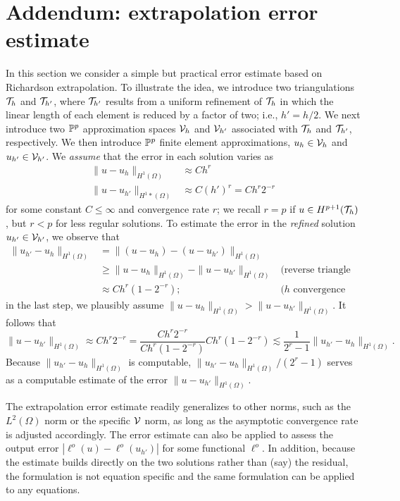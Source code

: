 \clearpage
\section{Addendum: extrapolation error estimate}
In this section we consider a simple but practical error estimate based on Richardson extrapolation.  %
To illustrate the idea, we introduce two triangulations $\mathcal{T}_h$ and $\mathcal{T}_{h'}$, where $\mathcal{T}_{h'}$ results from a uniform refinement of $\mathcal{T}_h$ in which the linear length of each element is reduced by a factor of two; i.e., $h' = h/2$. We next introduce two $\mathbb{P}^p$ approximation spaces $\mathcal{V}_h$ and $\mathcal{V}_{h'}$ associated with $\mathcal{T}_h$ and $\mathcal{T}_{h'}$, respectively. We then introduce $\mathbb{P}^p$ finite element approximations, $u_h \in \mathcal{V}_h$ and $u_{h'} \in \mathcal{V}_{h'}$.  We \emph{assume} that the error in each solution varies as
\begin{align*}
  \| u - u_h \|_{H^1(\Omega)} &\approx C h^r \\
  \| u - u_{h'} \|_{H^1*(\Omega)} &\approx C (h')^r = C h^r 2^{-r}
\end{align*}
for some constant $C \leq \infty$ and convergence rate $r$; we recall $r = p$ if $u \in H^{p+1}(\mathcal{T}_h)$, but $r < p$ for less regular solutions. To estimate the error in the \emph{refined} solution $u_{h'} \in \mathcal{V}_{h'}$, we observe that
\begin{align*}
  \| u_{h'} - u_h \|_{H^1(\Omega)}
  &= \| (u - u_{h}) - (u - u_{h'}) \|_{H^1(\Omega)}
  \\
  &\geq \| u - u_h \|_{H^1(\Omega)} - \| u - u_{h'} \|_{H^1(\Omega)} & \text{(reverse triangle inequality)}
  \\
  &\approx  C h^r(1-2^{-r}); &\text{($h$ convergence estimate)}  
\end{align*}
in the last step, we plausibly assume $\| u  - u_h \|_{H^1(\Omega)} > \| u - u_{h'} \|_{H^1(\Omega)}$. It follows that
\begin{equation*}
  \| u - u_{h'} \|_{H^1(\Omega)} \approx C h^r 2^{-r}
  = \frac{ C h^r 2^{-r} }{C h^r (1-2^{-r})} C h^r (1-2^{-r})
  \lesssim \frac{1}{2^r - 1} \| u_{h'} - u_h \|_{H^1(\Omega)}.
\end{equation*}
Because $\| u_{h'} - u_h \|_{H^1(\Omega)}$ is computable, $\| u_{h'} - u_h \|_{H^1(\Omega)}/(2^r-1)$ serves as a computable estimate of the error $\| u - u_{h'} \|_{H^1(\Omega)}$.

The extrapolation error estimate readily generalizes to other norms, such as the $L^2(\Omega)$ norm or the specific $\mathcal{V}$ norm, as long as the asymptotic convergence rate is adjusted accordingly. The error estimate can also be applied to assess the output error $| \ell^o(u) - \ell^o(u_{h'}) |$ for some functional $\ell^o$.  In addition, because the estimate builds directly on the two solutions rather than (say) the residual, the formulation is not equation specific and the same formulation can be applied to any equations.

